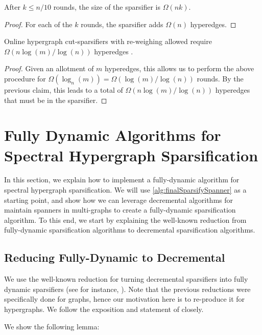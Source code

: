\documentclass{article}
\begin{document}
\begin{claim}
    After $k \leq n/10$ rounds, the size of the sparsifier is $\Omega(nk).$
\end{claim}

\begin{proof}
    For each of the $k$ rounds, the sparsifier adds $\Omega(n)$ hyperedges. 
\end{proof}

\begin{theorem}
    Online hypergraph cut-sparsifiers with re-weighing allowed require $\Omega(n \log(m) / \log(n))$ hyperedges .
\end{theorem}

\begin{proof}
    Given an allotment of $m$ hyperedges, this allows us to perform the above procedure for $\Omega(\log_n(m)) = \Omega(\log(m) / \log(n))$ rounds. By the previous claim, this leads to a total of $\Omega(n \log(m) / \log(n))$ hyperedges that must be in the sparsifier. 
\end{proof}


\section{Fully Dynamic Algorithms for Spectral Hypergraph Sparsification}\label{sec:FullyDynamic}

In this section, we explain how to implement a fully-dynamic algorithm for spectral hypergraph sparsification. We will use \cref{alg:finalSparsifySpanner} as a starting point, and show how we can leverage decremental algorithms for maintain spanners in multi-graphs to create a fully-dynamic sparsification algorithm. To this end, we start by explaining the well-known reduction from fully-dynamic sparsification algorithms to decremental sparsification algorithms.

\subsection{Reducing Fully-Dynamic to Decremental}

We use the well-known reduction for turning decremental sparsifiers into fully dynamic sparsifiers (see for instance, \cite{ADKKP16}). Note that the previous reductions were specifically done for graphs, hence our motivation here is to re-produce it for hypergraphs. We follow the exposition and statement of \cite{ADKKP16} closely. 

We show the following lemma:
\end{document}
